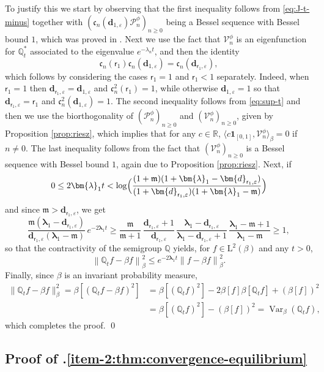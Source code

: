 \documentclass[JEP,XML,SOM,Unicode]{cedram}
\let\epsilon\varepsilon
\theoremstyle{plain}
\theoremstyle{definition}
\newcommand{\norm}[1]{\left\lVert#1\right\rVert}
\DeclareMathOperator{\Var}{Var}
\newcommand{\R}{\mathbb{R}}
\renewcommand{\P}{\mathcal{P}}
\newcommand{\V}{\mathcal{V}}
\newcommand{\J}{\mathds{Q}}
\newcommand{\Leb}{\mathrm{L}}
\newcommand{\m}{\mathfrak{m}}
\newcommand{\dpt}{\bm{d}_{\vat,\epsilon}}
\newcommand{\dz}{{\bm{d}}_{1,\epsilon}}
\newcommand{\lam}{{\bm{\lambda}_1}}
\newcommand{\vat}{{\mathsf{r}_1}}
\let\bpsi\beta
\begin{document}
To justify this we start by observing that the first inequality follows from \eqref{eq:J-t-minus} together with $(\mathfrak{c}_n(\dz)\P_n^\phi)_{n \geq 0}$ being a Bessel sequence with Bessel bound $1$, which was proved in . Next we use the fact that $\V_n^\phi$ is an eigenfunction for $\J_t^*$ associated to the eigenvalue $e^{-\lambda_n t}$, and then the identity
\begin{equation*}
\mathfrak{c}_n(\vat)\mathfrak{c}_n(\dz) = \mathfrak{c}_n(\dpt),
\end{equation*}
which follows by considering the cases $\vat = 1$ and $\vat < 1$ separately. Indeed, when $\vat = 1$ then $\dpt = \dz$ and $\mathfrak{c}_n^2(\vat) = 1$, while otherwise $\dz = 1$ so that $\dpt = \vat$ and $\mathfrak{c}_n^2(\dz) = 1$. The second inequality follows from \eqref{eq:sup-t} and then we use the biorthogonality of $(\P_n^\phi)_{n \geq 0}$ and $(\V_n^\phi)_{n \geq 0}$, given by Proposition \ref{prop:riesz}, which implies that for any $c \in \R$, $\langle c\bm{1}_{[0,1]}, \bm{\V}_n^\phi \rangle_{\bpsi} = 0$ if $n \neq 0$. The last inequality follows from the fact that $(\bm{\V}_n^\phi )_{n \geq 0}$ is a Bessel sequence with Bessel bound $1$, again due to Proposition \ref{prop:riesz}. Next, if
\[
0 \leq 2 \lam t < \log\Bigl(\frac{(1+\m)(1+\lam-\dpt)}{(1+\dpt)(1+\lam-\m)}\Bigr)
\]
and since $\m > \dpt$, we get
\begin{equation*}
\frac{\m(\lam-\dpt)}{\dpt(\lam-\m)}\, e^{-2\lam t} \geq \frac{\m}{\m+1}\, \frac{\dpt+1}{\dpt}\, \frac{\lam-\dpt}{\lam-\dpt+1}\, \frac{\lam-\m+1}{\lam-\m} \geq 1,
\end{equation*}
so that the contractivity of the semigroup $\J$ yields, for $f \in \Leb^2(\bpsi)$ and any $t > 0$,
\begin{equation*}
\norm{\J_t f - \bpsi f}_\bpsi^2 \leq e^{-2\lam t} \norm{f-\bpsi f}_\bpsi^2.
\end{equation*}
Finally, since $\bpsi$ is an invariant probability measure,
\begin{align*}
\|\J_t f - \bpsi f\|_\bpsi^2 = \bpsi[(\J_tf-\bpsi f)^2] &= \bpsi [ (\J_tf)^2 ] - 2 \bpsi [f] \bpsi [ \J_t f] + (\bpsi [f])^2\\
&= \bpsi [(\J_tf)^2] - (\bpsi [f])^2 = \Var_\bpsi(\J_tf),
\end{align*}
which completes the proof. \qed

\subsection{Proof of .\eqref{item-2:thm:convergence-equilibrium}}
\end{document}
